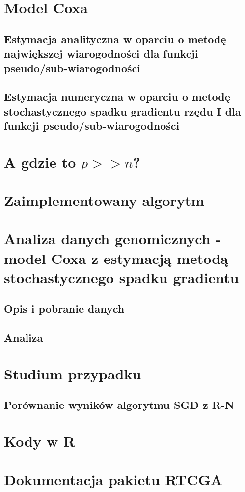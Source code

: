\documentclass{mini}
\begin{document}
\chapter{Model Coxa}
\section{Estymacja analityczna w oparciu o metodę największej wiarogodności dla funkcji pseudo/sub-wiarogodności}
\section{Estymacja numeryczna w oparciu o metodę stochastycznego spadku gradientu rzędu I dla funkcji pseudo/sub-wiarogodności}


\chapter{A gdzie to $p>>n$?}

\chapter{Zaimplementowany algorytm}
\chapter{Analiza danych genomicznych - model Coxa z estymacją metodą stochastycznego spadku gradientu}
\section{Opis i pobranie danych}
\section{Analiza}

\chapter{Studium przypadku}
\section{Porównanie wyników algorytmu SGD z R-N}


\appendix

\chapter{Kody w R}
\chapter{Dokumentacja pakietu RTCGA}


\makestatement
\end{document}
